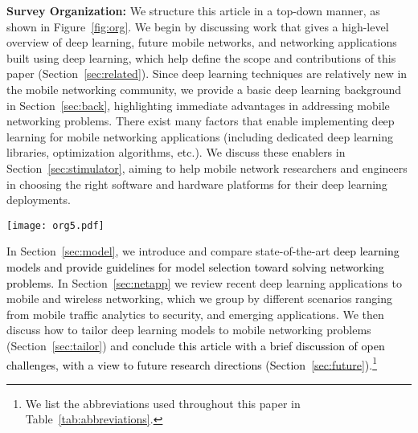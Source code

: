 \documentclass[journal,comsoc,letter]{IEEEtran}
\newcommand{\edit}[1]{\textcolor{black}{#1}}
\begin{document}
\noindent\textbf{Survey Organization:}  We structure this article in a top-down manner, as shown in Figure~\ref{fig:org}. We begin by discussing work that gives a high-level overview of deep learning, future mobile networks, and networking applications built using deep learning, which help define the scope and contributions of this paper (Section~\ref{sec:related}). Since deep learning techniques are relatively new in the mobile networking community, we provide a basic deep learning background in Section~\ref{sec:back}, highlighting immediate advantages in addressing mobile networking problems. 
There exist many factors that enable implementing deep learning for mobile networking applications (including dedicated deep learning libraries, optimization algorithms, etc.). We discuss these enablers in Section~\ref{sec:stimulator}, aiming to help mobile network researchers and engineers in choosing the right software and hardware platforms for their deep learning deployments.

\begin{figure*}[htb]
\begin{center}
\texttt{[image: org5.pdf]}
\end{center}
\caption{\label{fig:org} \edit{Diagramatic view of the organization of this survey.}}
\end{figure*}
In Section~\ref{sec:model}, we introduce and compare state-of-the-art \edit{deep learning models and provide guidelines for model selection toward solving networking problems.} In Section~\ref{sec:netapp} we review recent deep learning applications to mobile and wireless networking, which we group by different scenarios ranging from mobile traffic analytics to security, and emerging applications.
We then discuss how to tailor deep learning models to mobile networking problems (Section~\ref{sec:tailor}) and \edit{conclude this article with a brief discussion of open challenges, with a view to future research directions (Section~\ref{sec:future})}.\footnote{We list the abbreviations used throughout this paper in Table~\ref{tab:abbreviations}.}
\end{document}
